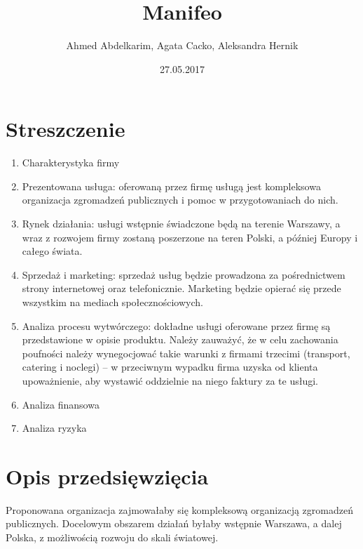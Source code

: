 \documentclass{article}
\title{\Huge{Manifeo}\\ %
}
\author{\large{Ahmed Abdelkarim, Agata Cacko, Aleksandra Hernik}}
\date{\large{27.05.2017}}
\begin{document}
\maketitle
\vspace{2cm}
\tableofcontents
\newpage




\section{Streszczenie}
\begin{enumerate}
\item Charakterystyka firmy
\item Prezentowana usługa: oferowaną przez firmę usługą jest kompleksowa organizacja zgromadzeń publicznych i pomoc w przygotowaniach do nich.
\item Rynek działania: usługi wstępnie świadczone będą na terenie Warszawy, a wraz z rozwojem firmy zostaną poszerzone na teren Polski, a później Europy i całego świata.
\item Sprzedaż i marketing: sprzedaż usług będzie prowadzona za pośrednictwem strony internetowej oraz telefonicznie. Marketing będzie opierać się przede wszystkim na mediach społecznościowych. 
\item Analiza procesu wytwórczego: dokładne usługi oferowane przez firmę są przedstawione w opisie produktu. Należy zauważyć, że w celu zachowania poufności należy wynegocjować takie warunki z firmami trzecimi (transport, catering i noclegi) -- w przeciwnym wypadku firma uzyska od klienta upoważnienie, aby wystawić oddzielnie na niego faktury za te usługi. 
\item Analiza finansowa
\item Analiza ryzyka
\end{enumerate}

\section{Opis przedsięwzięcia}
Proponowana organizacja zajmowałaby się kompleksową organizacją zgromadzeń publicznych. Docelowym obszarem działań byłaby wstępnie Warszawa, a dalej Polska, z możliwością rozwoju do skali światowej.   
\end{document}
